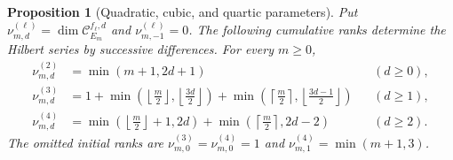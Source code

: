 \documentclass[reqno]{article}
\theoremstyle{plain} %
\newtheorem{proposition}[theorem]{Proposition}
\theoremstyle{definition}
\theoremstyle{remark}
\newcommand {\CC}{\mathscr{C}}
\numberwithin{equation}{section}
\begin{document}
\begin{proposition}[Quadratic, cubic, and quartic parameters]
\label{prop:Em}
Put $\nu_{m,d}^{(\ell)}=\dim\CC_{E_m}^{f_\ell,d}$ and
$\nu_{m,-1}^{(\ell)}=0$. The following cumulative ranks determine the
Hilbert series by successive differences. For every $m\ge0$,
\begin{align}
 \nu_{m,d}^{(2)}&=\min(m+1,2d+1) &&(d\ge0),
       \label{eq:parallel-quadratic-rank}\\
 \nu_{m,d}^{(3)}&=1+
  \min\left(\left\lfloor\frac m2\right\rfloor,
            \left\lfloor\frac{3d}{2}\right\rfloor\right)
  +\min\left(\left\lceil\frac m2\right\rceil,
             \left\lfloor\frac{3d-1}{2}\right\rfloor\right)
       &&(d\ge1),\label{eq:parallel-cubic-rank}\\
 \nu_{m,d}^{(4)}&=
  \min\left(\left\lfloor\frac m2\right\rfloor+1,2d\right)
  +\min\left(\left\lceil\frac m2\right\rceil,2d-2\right)
       &&(d\ge2).\label{eq:parallel-quartic-rank}
\end{align}
The omitted initial ranks are $\nu_{m,0}^{(3)}=\nu_{m,0}^{(4)}=1$
and $\nu_{m,1}^{(4)}=\min(m+1,3)$.
\end{proposition}
\end{document}
